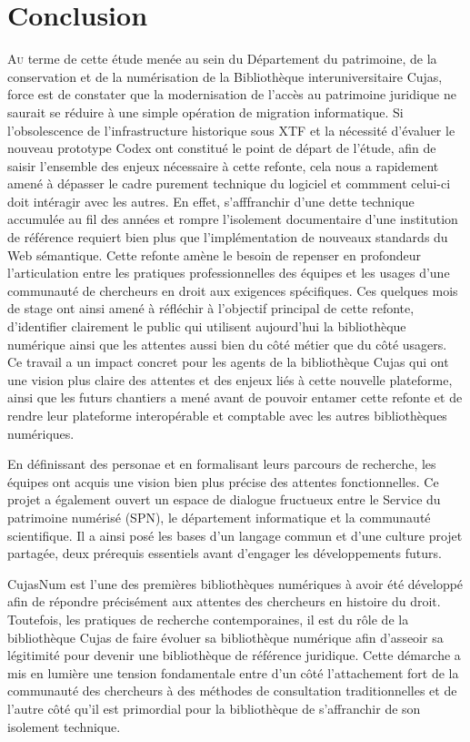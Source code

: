 \chapter*{Conclusion}

\lettrine{A}u terme de cette étude menée au sein du Département du patrimoine, de la conservation et de la numérisation de la Bibliothèque interuniversitaire Cujas, force est de constater que la modernisation de l'accès au patrimoine juridique ne saurait se réduire à une simple opération de migration informatique. Si l'obsolescence de l'infrastructure historique sous XTF et la nécessité d'évaluer le nouveau prototype Codex ont constitué le point de départ de l'étude, afin de saisir l'ensemble des enjeux nécessaire à cette refonte, cela nous a rapidement amené à dépasser le cadre purement technique du logiciel et commment celui-ci doit intéragir avec les autres. En effet, s'afffranchir d'une dette technique accumulée au fil des années et rompre l'isolement documentaire d'une institution de référence requiert bien plus que l'implémentation de nouveaux standards du Web sémantique. Cette refonte amène le besoin de repenser en profondeur l'articulation entre les pratiques professionnelles des équipes et les usages d'une communauté de chercheurs en droit aux exigences spécifiques. Ces quelques mois de stage ont ainsi amené à réfléchir à l'objectif principal de cette refonte, d'identifier clairement le public qui utilisent aujourd'hui la bibliothèque numérique ainsi que les attentes aussi bien du côté métier que du côté usagers. Ce travail a un impact concret pour les agents de la bibliothèque Cujas qui ont une vision plus claire des attentes et des enjeux liés à cette nouvelle plateforme, ainsi que les futurs chantiers a mené avant de pouvoir entamer cette refonte et de rendre leur plateforme interopérable et comptable avec les autres bibliothèques numériques.

En définissant des personae et en formalisant leurs parcours de recherche, les équipes ont acquis une vision bien plus précise des attentes fonctionnelles. Ce projet a également ouvert un espace de dialogue fructueux entre le Service du patrimoine numérisé (SPN), le département informatique et la communauté scientifique. Il a ainsi posé les bases d'un langage commun et d'une culture projet partagée, deux prérequis essentiels avant d'engager les développements futurs.

CujasNum est l'une des premières bibliothèques numériques à avoir été développé afin de répondre précisément aux attentes des chercheurs en histoire du droit. Toutefois, les pratiques de recherche contemporaines, il est du rôle de la bibliothèque Cujas de faire évoluer sa bibliothèque numérique afin d'asseoir sa légitimité pour devenir une bibliothèque de référence juridique. Cette démarche a mis en lumière une tension fondamentale entre d'un côté l'attachement fort de la communauté des chercheurs à des méthodes de consultation traditionnelles et de l'autre côté qu'il est primordial pour la bibliothèque de s'affranchir de son isolement technique.

